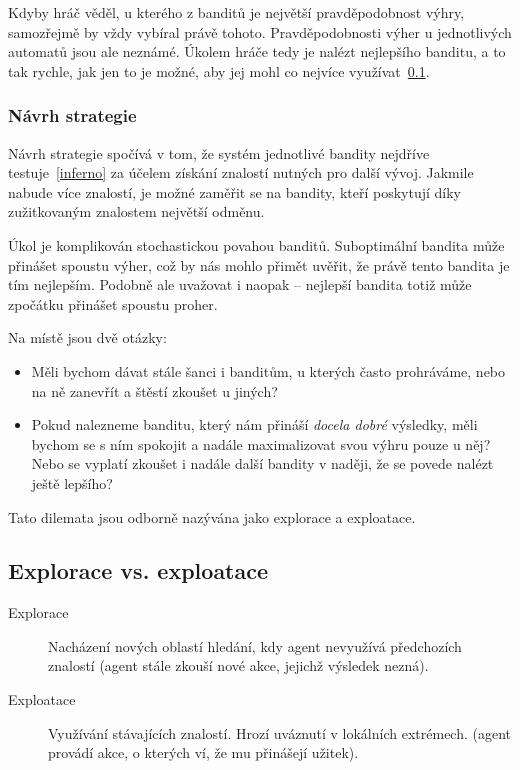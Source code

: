 \documentclass[thesis=M,czech]{FITthesis}[2014/05/07]
\begin{document}
Kdyby hráč věděl, u kterého z banditů je největší pravděpodobnost výhry, samozřejmě by vždy vybíral právě tohoto. Pravděpodobnosti výher u jednotlivých automatů jsou ale neznámé. Úkolem hráče tedy je nalézt nejlepšího banditu, a to tak rychle, jak jen to je možné, aby jej mohl co nejvíce využívat~\ref{sub:explo}.

\subsubsection{Návrh strategie}
Návrh strategie spočívá v tom, že systém jednotlivé bandity nejdříve testuje~\ref{inferno} za účelem získání znalostí nutných pro další vývoj. Jakmile nabude více znalostí, je možné zaměřit se na bandity, kteří poskytují díky zužitkovaným znalostem největší odměnu. 

Úkol je komplikován stochastickou povahou banditů. Suboptimální bandita může přinášet spoustu výher, což by nás mohlo přimět uvěřit, že právě tento bandita je tím nejlepším. Podobně ale uvažovat i naopak – nejlepší bandita totiž může zpočátku přinášet spoustu proher.

Na místě jsou dvě otázky:

\begin{itemize}
	\item Měli bychom dávat stále šanci i banditům, u kterých často prohráváme, nebo na ně zanevřít a štěstí zkoušet u jiných?
	\item Pokud nalezneme banditu, který nám přináší \emph{docela dobré} výsledky, měli bychom se s ním spokojit a nadále maximalizovat svou výhru pouze u něj? Nebo se vyplatí zkoušet i nadále další bandity v naději, že se povede nalézt ještě lepšího?
\end{itemize}

Tato dilemata jsou odborně nazývána jako explorace a exploatace.

\subsection{Explorace vs. exploatace}
\label{sub:explo}

\begin{description}
  \item[Explorace] Nacházení nových oblastí hledání, kdy agent nevyužívá předchozích znalostí (agent stále zkouší nové akce, jejichž výsledek nezná).
  \item[Exploatace] Využívání stávajících znalostí. Hrozí uváznutí v lokálních extrémech. (agent provádí akce, o kterých ví, že mu přinášejí užitek). 
\end{description}	
\end{document}
